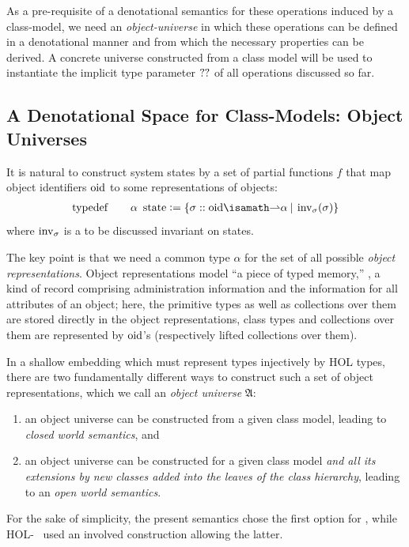 As a pre-requisite of a denotational semantics for these operations induced
by a class-model, we need an \emph{object-universe} in which these operations can
be defined in a denotational manner and from which the necessary properties
can be derived. A concrete universe constructed from a class model will be 
used to instantiate the implicit type parameter $??$ of all \OCL operations
discussed so far.

\subsection{A Denotational Space for Class-Models: Object Universes}

It is natural to construct system states by a set of partial functions
$f$ that map object identifiers $\mathrm{oid}$ to some representations of
objects:
\begin{gather}
       \typedef \qquad \alpha~\state{} \defeq \{ \sigma ::
        \oid \isasymrightharpoonup \alpha \ap|\ap \inv_\sigma(\sigma) \}
\end{gather}
where $\operatorname{inv}_\sigma$ is a to be discussed invariant on states.

The key point is that we need a common type $\alpha$ for the set of all
possible \emph{object representations}.  Object representations model
``a piece of typed memory,'' \ie, a kind of record comprising
administration information and the information for all attributes of
an object; here, the primitive types as well as collections over them
are stored directly in the object representations, class types and
collections over them are represented by $\mathrm{oid}$'s (respectively lifted
collections over them).

In a shallow embedding which must represent
\UML types injectively by HOL types, there are two fundamentally
different ways to construct such a set of object representations,
which we call an \emph{object universe} $\mathfrak{A}$:
\begin{enumerate}
\item an object universe can be constructed from a given class model,
  leading to \emph{closed world semantics}, and
\item an object universe can be constructed for a given class model
  \emph{and all its extensions by new classes added into the leaves of
    the class hierarchy}, leading to an \emph{open world semantics}.
\end{enumerate}
For the sake of simplicity, the present semantics chose the first option for
 \FOCL, while HOL-\OCL~\cite{brucker.ea:extensible:2008-b}
used an involved construction allowing the latter.

